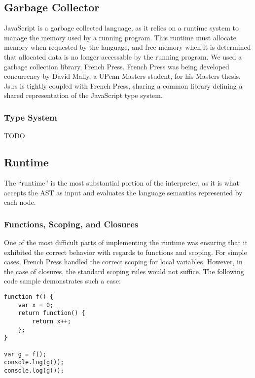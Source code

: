 \documentclass{article}
\begin{document}
\begin{multicols}{2}
\subsection{Garbage Collector}

JavaScript is a garbage collected language, as it relies on a runtime system to
manage the memory used by a running program. This runtime must allocate memory
when requested by the language, and free memory when it is determined that
allocated data is no longer accessable by the running program. We used a garbage
collection library, French Press. French Press was being developed concurrency
by David Mally, a UPenn Masters student, for his Masters thesis. Js.rs is
tightly coupled with French Press, sharing a common library defining a shared
representation of the JavaScript type system.

\subsubsection*{Type System}

TODO

\subsection{Runtime}

The ``runtime'' is the most substantial portion of the interpreter, as it is
what accepts the AST as input and evaluates the language semantics represented
by each node.

\subsubsection*{Functions, Scoping, and Closures}

One of the most difficult parts of implementing the runtime was ensuring that it
exhibited the correct behavior with regards to functions and scoping. For simple
cases, French Press handled the correct scoping for local variables. However,
in the case of closures, the standard scoping rules would not suffice. The
following code sample demonstrates such a case:

\vspace{3mm}

\begin{lstlisting}
function f() {
    var x = 0;
    return function() {
        return x++;
    };
}

var g = f();
console.log(g());
console.log(g());

\end{lstlisting}


\end{multicols}
\end{document}

